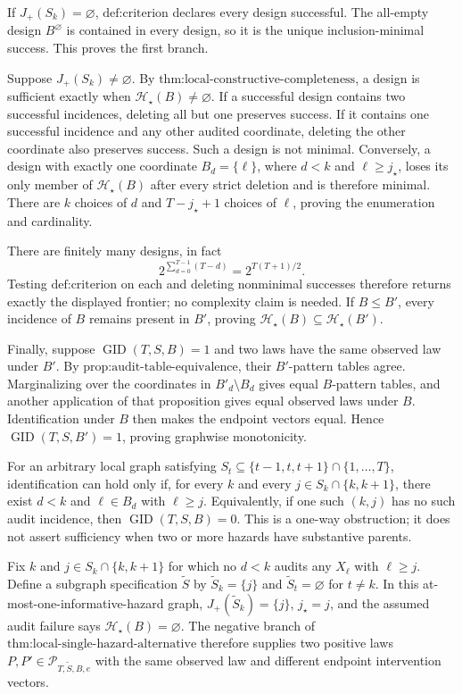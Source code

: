 If \(J_+(S_k)=\varnothing\), \(\text{def:criterion}\) declares every design successful.  The all-empty design \(B^\varnothing\) is contained in every design, so it is the unique inclusion-minimal success.  This proves the first branch.

Suppose \(J_+(S_k)\ne\varnothing\).  By
\(\text{thm:local-constructive-completeness}\), a design is sufficient exactly when \(\mathcal H_\star(B)\ne\varnothing\).  If a successful design contains two successful incidences, deleting all but one preserves success.  If it contains one successful incidence and any other audited coordinate, deleting the other coordinate also preserves success.  Such a design is not minimal.  Conversely, a design with exactly one coordinate \(B_d=\{\ell\}\), where \(d<k\) and \(\ell\ge j_\star\), loses its only member of \(\mathcal H_\star(B)\) after every strict deletion and is therefore minimal.  There are \(k\) choices of \(d\) and \(T-j_\star+1\) choices of \(\ell\), proving the enumeration and cardinality.

There are finitely many designs, in fact
\[
2^{\sum_{d=0}^{T-1}(T-d)}=2^{T(T+1)/2}.
\]
Testing \(\text{def:criterion}\) on each and deleting nonminimal successes therefore returns exactly the displayed frontier; no complexity claim is needed.  If \(B\le B'\), every incidence of \(B\) remains present in \(B'\), proving
\(\mathcal H_\star(B)\subseteq\mathcal H_\star(B')\).

Finally, suppose \(\operatorname{GID}(T,S,B)=1\) and two laws have the same observed law under \(B'\).  By \(\text{prop:audit-table-equivalence}\), their \(B'\)-pattern tables agree.  Marginalizing over the coordinates in
\(B'_d\setminus B_d\) gives equal \(B\)-pattern tables, and another application of that proposition gives equal observed laws under \(B\).  Identification under \(B\) then makes the endpoint vectors equal.  Hence
\(\operatorname{GID}(T,S,B')=1\), proving graphwise monotonicity.

For an arbitrary local graph satisfying
\(S_t\subseteq\{t-1,t,t+1\}\cap\{1,\ldots,T\}\), identification can hold only if, for every \(k\) and every
\(j\in S_k\cap\{k,k+1\}\), there exist \(d<k\) and
\(\ell\in B_d\) with \(\ell\ge j\).  Equivalently, if one such \((k,j)\) has no such audit incidence, then
\(\operatorname{GID}(T,S,B)=0\).  This is a one-way obstruction; it does not assert sufficiency when two or more hazards have substantive parents.

Fix \(k\) and \(j\in S_k\cap\{k,k+1\}\) for which no \(d<k\) audits any \(X_\ell\) with \(\ell\ge j\).  Define a subgraph specification
\(\widetilde S\) by \(\widetilde S_k=\{j\}\) and
\(\widetilde S_t=\varnothing\) for \(t\ne k\).  In this at-most-one-informative-hazard graph,
\(J_+(\widetilde S_k)=\{j\}\), \(j_\star=j\), and the assumed audit failure says
\(\mathcal H_\star(B)=\varnothing\).  The negative branch of
\(\text{thm:local-single-hazard-alternative}\) therefore supplies two positive laws \(P,P'\in\mathcal P_{T,\widetilde S,B,e}\) with the same observed law and different endpoint intervention vectors.

